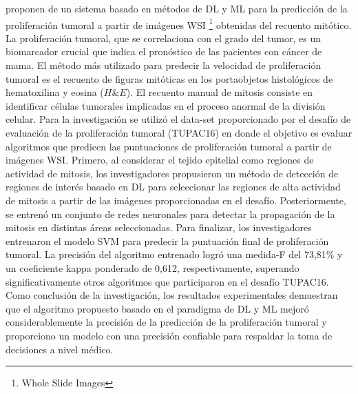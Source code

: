 \citep{Nateghi2021} proponen de un sistema basado en métodos de DL y ML para la predicción de la proliferación tumoral a partir de imágenes WSI \footnote{ Whole Slide Images } obtenidas del recuento mitótico. La proliferación tumoral, que se correlaciona con el grado del tumor, es un biomarcador crucial que indica el pronóstico de las pacientes con cáncer de mama. El método más utilizado para predecir la velocidad de proliferación tumoral es el recuento de figuras mitóticas en los portaobjetos histológicos de hematoxilina y eosina ($H\&E$). El recuento manual de mitosis consiste en identificar células tumorales implicadas en el proceso anormal de la división celular. Para la investigación se utilizó el data-set proporcionado por el desafío de evaluación de la proliferación tumoral (TUPAC16) en donde el objetivo es evaluar algoritmos que predicen las puntuaciones de proliferación tumoral a partir de imágenes WSI. Primero, al considerar el tejido epitelial como regiones de actividad de mitosis, los investigadores propusieron un método de detección de regiones de interés basado en DL para seleccionar las regiones de alta actividad de mitosis a partir de las imágenes proporcionadas en el desafío. Posteriormente, se entrenó un conjunto de redes neuronales para detectar la propagación de la mitosis en distintas áreas seleccionadas. Para finalizar, los investigadores entrenaron el modelo SVM para predecir la puntuación final de proliferación tumoral. La precisión del algoritmo entrenado logró una medida-F del 73,81\% y un coeficiente kappa ponderado de 0,612, respectivamente, superando significativamente otros algoritmos que participaron en el desafío TUPAC16. Como conclusión de la investigación, los resultados experimentales demuestran que el algoritmo propuesto basado en el paradigma de DL y ML mejoró considerablemente la precisión de la predicción de la proliferación tumoral y proporciono un modelo con una precisión confiable para respaldar la toma de decisiones a nivel médico.

